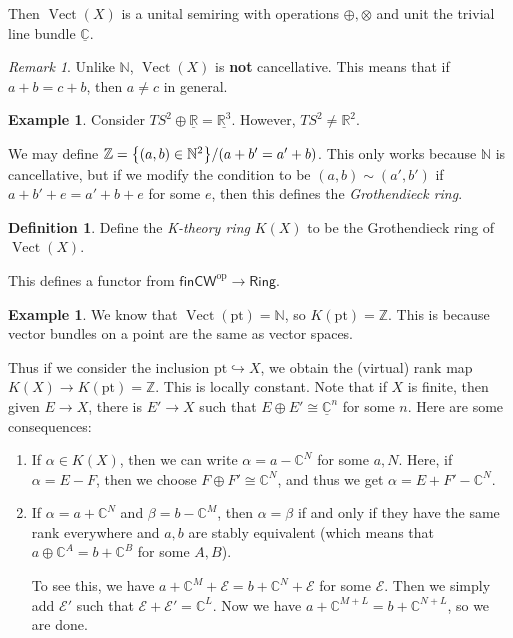 \documentclass[leqno, openany]{memoir}
\theoremstyle{definition}
\newtheorem{defn}[thm]{Definition}
\newtheorem{exm}[thm]{Example}
\theoremstyle{remark}
\newtheorem{rmk}[thm]{Remark}
\theoremstyle{plain}
\theoremstyle{definition}
\theoremstyle{remark}
\newcommand{\N}{\mathbb{N}}
\newcommand{\R}{\mathbb{R}}
\newcommand{\C}{\mathbb{C}}
\newcommand{\Z}{\mathbb{Z}}
\newcommand{\mc}[1]{\mathcal{#1}}
\newcommand{\mr}[1]{\mathrm{#1}}
\newcommand{\ms}[1]{\mathsf{#1}}
\newcommand{\ul}[1]{\underline{#1}}
\DeclareMathOperator{\Vect}{Vect}
\begin{document}
Then $\Vect(X)$ is a unital semiring with operations $\oplus, \otimes$ and unit
the trivial line bundle $\underline{\C}$.

\begin{rmk} Unlike $\N$, $\Vect(X)$ is \textbf{not} cancellative. This means
that if $a+b = c+b$, then $a \neq c$ in general.  \end{rmk}

\begin{exm} Consider $TS^2 \oplus \ul{\R} = \ul{\R^3}$. However, $TS^2 \neq
\R^2$.  \end{exm}

We may define $\Z = \qty{(a,b) \in \N^2} / (a+b' = a'+b)$. This only works
because $\N$ is cancellative, but if we modify the condition to be $(a,b) \sim
(a',b')$ if $a+b'+e = a'+b+e$ for some $e$, then this defines the
\textit{Grothendieck ring}.

\begin{defn} Define the \textit{K-theory ring} $K(X)$ to be the Grothendieck
ring of $\Vect(X)$.  \end{defn}

This defines a functor from $\ms{finCW}^{\mr{op}} \to \ms{Ring}$.

\begin{exm} We know that $\Vect(\mr{pt}) = \N$, so $K(\mr{pt}) = \Z$. This is
because vector bundles on a point are the same as vector spaces.  \end{exm}

Thus if we consider the inclusion $\mr{pt} \hookrightarrow X$, we obtain the
(virtual) rank map $K(X) \to K(\mr{pt}) = \Z$. This is locally constant. Note
that if $X$ is finite, then given $E \to X$, there is $E' \to X$ such that $E
\oplus E' \cong \ul{\C}^n$ for some $n$. Here are some consequences:
\begin{enumerate} \item If $\alpha \in K(X)$, then we can write $\alpha = a -
    \C^N$ for some $a, N$. Here, if $\alpha = E-F$, then we choose $F \oplus F'
    \cong \C^N$, and thus we get $\alpha = E + F' - \C^N$.  \item If $\alpha =
    a + \C^N$ and $\beta = b - \C^M$, then $\alpha = \beta$ if and only if they
    have the same rank everywhere and $a,b$ are stably equivalent (which means
    that $a \oplus \C^A = b + \C^B$ for some $A,B$).

        To see this, we have $a + \C^M + \mc{E} = b + \C^N + \mc{E}$ for some
$\mc{E}$. Then we simply add $\mc{E}'$ such that $\mc{E} + \mc{E}' = \C^L$. Now
we have $a + \C^{M+L} = b + \C^{N+L}$, so we are done.  \end{enumerate}
\end{document}
